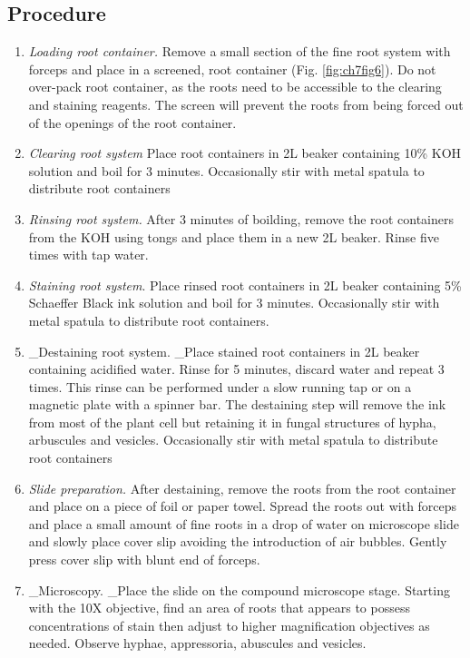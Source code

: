\documentclass[]{book}
\providecommand{\tightlist}{%
  \setlength{\itemsep}{0pt}\setlength{\parskip}{0pt}}
\begin{document}
\hypertarget{procedure-1}{%
\subsection{Procedure}\label{procedure-1}}

\begin{enumerate}
\def\labelenumi{\arabic{enumi}.}
\tightlist
\item
  \emph{Loading root container.} Remove a small section of the fine root system with forceps and place in a screened, root container (Fig. \ref{fig:ch7fig6}). Do not over-pack root container, as the roots need to be accessible to the clearing and staining reagents. The screen will prevent the roots from being forced out of the openings of the root container.
\item
  \emph{Clearing root system} Place root containers in 2L beaker containing 10\% KOH solution and boil for 3 minutes. Occasionally stir with metal spatula to distribute root containers
\item
  \emph{Rinsing root system.} After 3 minutes of boilding, remove the root containers from the KOH using tongs and place them in a new 2L beaker. Rinse five times with tap water.
\item
  \emph{Staining root system}. Place rinsed root containers in 2L beaker containing 5\% Schaeffer Black ink solution and boil for 3 minutes. Occasionally stir with metal spatula to distribute root containers.
\item
  \_Destaining root system. \_Place stained root containers in 2L beaker containing acidified water. Rinse for 5 minutes, discard water and repeat 3 times. This rinse can be performed under a slow running tap or on a magnetic plate with a spinner bar. The destaining step will remove the ink from most of the plant cell but retaining it in fungal structures of hypha, arbuscules and vesicles. Occasionally stir with metal spatula to distribute root containers
\item
  \emph{Slide preparation.} After destaining, remove the roots from the root container and place on a piece of foil or paper towel. Spread the roots out with forceps and place a small amount of fine roots in a drop of water on microscope slide and slowly place cover slip avoiding the introduction of air bubbles. Gently press cover slip with blunt end of forceps.
\item
  \_Microscopy. \_Place the slide on the compound microscope stage. Starting with the 10X objective, find an area of roots that appears to possess concentrations of stain then adjust to higher magnification objectives as needed. Observe hyphae, appressoria, abuscules and vesicles.
\end{enumerate}
\end{document}
